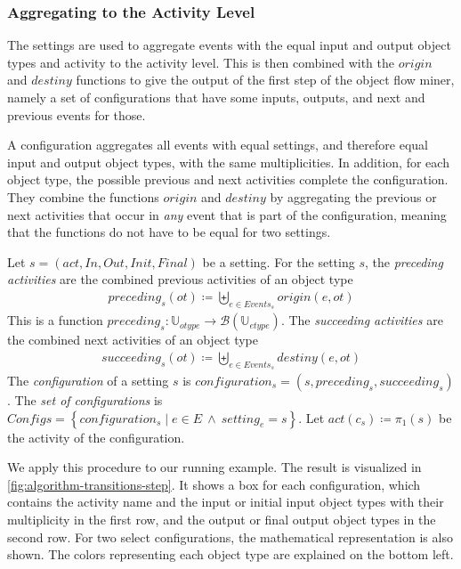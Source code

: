 \subsubsection{Aggregating to the Activity Level}


The settings are used to aggregate events with the equal input and output object types and activity to the activity level.
This is then combined with the $origin$ and $destiny$ functions to give the output of the first step of the object flow miner, namely a set of configurations that have some inputs, outputs, and next and previous events for those.



A configuration aggregates all events with equal settings, and therefore equal input and output object types, with the same multiplicities.
In addition, for each object type, the possible previous and next activities complete the configuration.
They combine the functions $origin$ and $destiny$ by aggregating the previous or next activities that occur in \textit{any} event that is part of the configuration, meaning that the functions do not have to be equal for two settings.
\begin{definition}[Configuration]
    Let $s = (act, \mathit{In}, \mathit{Out}, \mathit{Init}, \mathit{Final})$ be a setting.
    For the setting $s$, the \emph{preceding activities} are the combined previous activities of an object type 
    \begin{align*}
        preceding_s(ot) \coloneqq \biguplus_{e \in \mathit{Events}_s} origin(e, ot)
    \end{align*}
    This is a function $preceding_s: \mathbb{U}_{otype} \to \mathcal{B}(\mathbb{U}_{etype})$.
    The \emph{succeeding activities} are the combined next activities of an object type
    \begin{align*}
        succeeding_s(ot) \coloneqq \biguplus_{e \in \mathit{Events}_s} destiny(e, ot)
    \end{align*}
    The \emph{configuration} of a setting $s$ is $configuration_s = (s, \allowbreak preceding_s, \allowbreak succeeding_s)$.
    The \emph{set of configurations} is $\mathit{Configs} = \left\{ configuration_s \mid e \in E\ \land\ setting_e = s \right\}$.
    Let $act(c_s) \coloneqq \pi_1(s)$ be the activity of the configuration.
\end{definition}



We apply this procedure to our running example.
The result is visualized in \autoref{fig:algorithm-transitions-step}.
It shows a box for each configuration, which contains the activity name and the input or initial input object types with their multiplicity in the first row, and the output or final output object types in the second row.
For two select configurations, the mathematical representation is also shown.
The colors representing each object type are explained on the bottom left.


